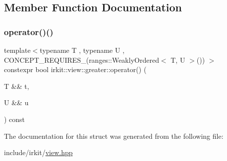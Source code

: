 \subsection{Member Function Documentation}
\mbox{\label{structirkit_1_1view_1_1greater_af6f67e2c5f9976b8e6a4ff3ddc9fbd1d}} 
\subsubsection{\texorpdfstring{operator()()}{operator()()}}
{\footnotesize\ttfamily template$<$typename T , typename U , C\+O\+N\+C\+E\+P\+T\+\_\+\+R\+E\+Q\+U\+I\+R\+E\+S\+\_\+(ranges\+::\+Weakly\+Ordered$<$ T, U $>$()) $>$ \\
constexpr bool irkit\+::view\+::greater\+::operator() (\begin{DoxyParamCaption}\item[{T \&\&}]{t,  }\item[{U \&\&}]{u }\end{DoxyParamCaption}) const\hspace{0.3cm}{\ttfamily [inline]}}



The documentation for this struct was generated from the following file\+:\begin{DoxyCompactItemize}
\item 
include/irkit/\mbox{\hyperlink{view_8hpp}{view.\+hpp}}\end{DoxyCompactItemize}
